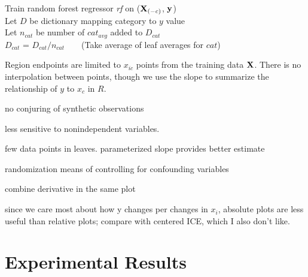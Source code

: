 \documentclass[12pt]{article}
\begin{document}
\setlength{\algomargin}{5pt}
\begin{algorithm}[H]
\label{alg:CatStratPD}
\LinesNumbered
{}
\SetAlgoSkip{}
\SetInd{.5em}{.5em}
Train random forest regressor {\it rf} on (${\bf X}_{(-c)}$, $\bf y$)\\
Let $D$ be dictionary mapping category to $y$ value\\
Let $n_{cat}$ be number of $cat_{avg}$ added to $D_{cat}$\\
$D_{cat}$ = $D_{cat} / n_{cat}$~~~~(Take average of leaf averages for $cat$)\\
\end{algorithm}


Region endpoints are limited to $x_{ic}$ points from the training data $\bf X$.  There is no interpolation between points, though we use the slope to summarize the relationship of $y$ to $x_c$ in $R$.

no conjuring of synthetic observations

less sensitive to nonindependent variables.
 
few data points in leaves. parameterized slope provides better estimate

randomization means of controlling for confounding variables

combine derivative in the same plot

since we care most about how y changes per changes in $x_i$, absolute plots are less useful than relative plots; compare with centered ICE, which I also don't like.

\section{Experimental Results}
\end{document}

